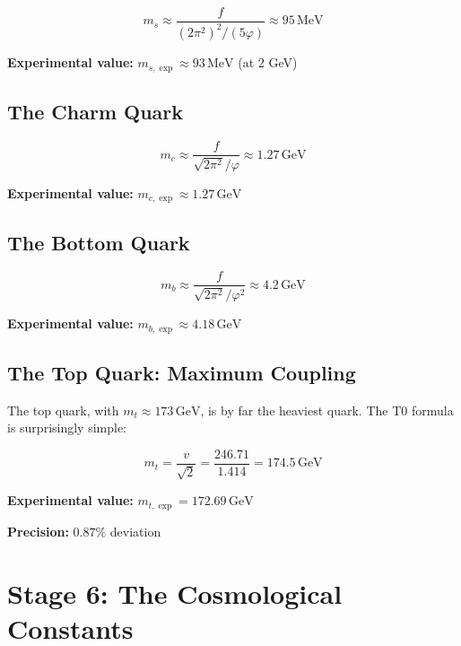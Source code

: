 	\begin{equation}
		\boxed{m_s \approx \frac{f}{(2\pi^2)^2/(5\varphi)} \approx 95\,\text{MeV}}
	\end{equation}
	
	\textbf{Experimental value:} \(m_{s,\exp} \approx 93\,\text{MeV}\) (at 2 GeV)
	
	\subsection{The Charm Quark}
	
	\begin{equation}
		\boxed{m_c \approx \frac{f}{\sqrt{2\pi^2}/\varphi} \approx 1.27\,\text{GeV}}
	\end{equation}
	
	\textbf{Experimental value:} \(m_{c,\exp} \approx 1.27\,\text{GeV}\)
	
	\subsection{The Bottom Quark}
	
	\begin{equation}
		\boxed{m_b \approx \frac{f}{\sqrt{2\pi^2}/\varphi^2} \approx 4.2\,\text{GeV}}
	\end{equation}
	
	\textbf{Experimental value:} \(m_{b,\exp} \approx 4.18\,\text{GeV}\)
	
	\subsection{The Top Quark: Maximum Coupling}
	
	The top quark, with \(m_t \approx 173\,\text{GeV}\), is by far the heaviest quark. The T0 formula is surprisingly simple:
	
	\begin{equation}
		\boxed{m_t = \frac{v}{\sqrt{2}} = \frac{246.71}{1.414} = 174.5\,\text{GeV}}
	\end{equation}
	
	\textbf{Experimental value:} \(m_{t,\exp} = 172.69\,\text{GeV}\)
	
	\textbf{Precision:} \(0.87\%\) deviation
	
	\section{Stage 6: The Cosmological Constants}
	

